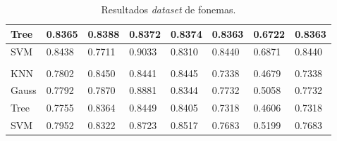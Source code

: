 \begin{table}[h]
\begin{tabular}{|l|l|l|l|l|l|l|l|}
		Tree                                                      & 0.8365                         & 0.8388                         & 0.8372                         & 0.8374                         & 0.8363                         & 0.6722                         & 0.8363                         \\ \hline
		SVM                                                       & 0.8438                         & 0.7711                         & 0.9033                         & 0.8310                         & 0.8440                         & 0.6871                         & 0.8440                         \\ \hline
		\cellcolor[HTML]{000000}{\color[HTML]{FFFFFF} PCA}        &                                &                                &                                &                                &                                &                                &                                \\ \hline
		KNN                                                       & 0.7802                         & 0.8450                         & 0.8441                         & 0.8445                         & 0.7338                         & 0.4679                         & 0.7338                         \\ \hline
		Gauss                                                     & 0.7792                         & 0.7870                         & 0.8881                         & 0.8344                         & 0.7732                         & 0.5058                         & 0.7732                         \\ \hline
		Tree                                                      & 0.7755                         & 0.8364                         & 0.8449                         & 0.8405                         & \cellcolor[HTML]{CB0000}0.7318 & \cellcolor[HTML]{CB0000}0.4606 & \cellcolor[HTML]{CB0000}0.7318 \\ \hline
		SVM                                                       & 0.7952                         & 0.8322                         & 0.8723                         & 0.8517                         & 0.7683                         & 0.5199                         & 0.7683                         \\ \hline
	\end{tabular}
	\caption{Resultados \textit{dataset} de fonemas.}
	\label{resul_fonema}
\end{table}


